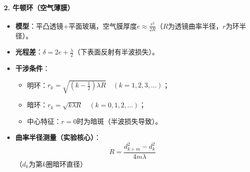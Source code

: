 \paragraph{2. 牛顿环（空气薄膜）}
\begin{itemize}
    \item \textbf{模型}：平凸透镜+平面玻璃，空气膜厚度$e \approx \frac{r^2}{2R}$（$R$为透镜曲率半径，$r$为环半径）。
    \item \textbf{光程差}：$\delta = 2e + \frac{\lambda}{2}$（下表面反射有半波损失）。
    \item \textbf{干涉条件}：
          \begin{itemize}
              \item 明环：$r_k = \sqrt{\left(k - \frac{1}{2}\right)\lambda R} \quad (k=1,2,3,\dots)$；
              \item 暗环：$r_k = \sqrt{k\lambda R} \quad (k=0,1,2,\dots)$；
              \item 中心特征：$r=0$时为暗斑（半波损失导致）。
          \end{itemize}
    \item \textbf{曲率半径测量（实验核心）}：
          \[
          R = \frac{d_{k+m}^2 - d_k^2}{4m\lambda}
          \]（$d_k$为第$k$圈暗环直径）
\end{itemize}

